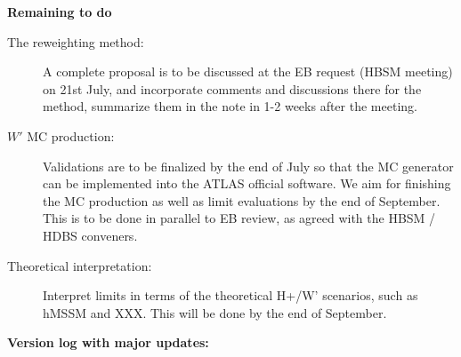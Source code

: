 \textbf{Remaining to do}

\begin{description}

\item[The reweighting method:] A complete proposal is to be discussed at the EB request (HBSM meeting) on 21st July, and incorporate comments and discussions there for the method, summarize them in the note in 1-2 weeks after the meeting.

\item[$W'$ MC production:] Validations are to be finalized by the end of July so that the MC generator can be implemented into the ATLAS official software. We aim for finishing the MC production as well as limit evaluations by the end of September. This is to be done in parallel to EB review, as agreed with the HBSM / HDBS conveners.

\item[Theoretical interpretation: ] Interpret limits in terms of the theoretical H+/W' scenarios, such as hMSSM and XXX. This will be done by the end of September.

\end{description}

\textbf{Version log with major updates:}

